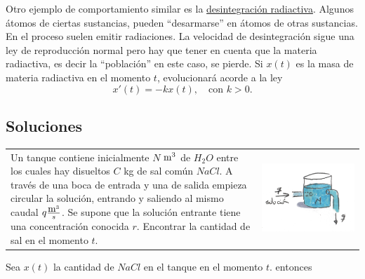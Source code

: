 \documentclass{article}
\newcounter{ejemplo_cont}
\begin{document}
  Otro ejemplo de comportamiento similar es la \href{http://es.wikipedia.org/wiki/Radiactividad}{desintegración radiactiva}. Algunos átomos de
ciertas sustancias, pueden ``desarmarse'' en átomos de otras sustancias. En el proceso suelen emitir radiaciones.  La velocidad de desintegración sigue una ley
de reproducción normal pero hay que tener en cuenta que la materia radiactiva, es decir la ``población''  en este caso, se pierde. Si $x(t)$ es la masa de materia radiactiva en el momento $t$, evolucionará
acorde a la ley
\[\boxed{x'(t)=-kx(t),\quad\text{con } k>0.}\]



\subsection{Soluciones}

\begin{problema}
\begin{tabular}{m{5cm} m{4.5cm}}
 Un tanque contiene inicialmente $N$ $\hbox{m}^3$ de $H_2O$ entre los cuales hay disueltos $C$ kg de sal común
 $NaCl$. A través de una boca de entrada y una de salida empieza circular la solución, entrando y saliendo al mismo caudal $q\frac{\hbox{m}^3}{s}$. Se supone que 
 la solución entrante tiene una concentración conocida $r$. Encontrar la cantidad de sal en el momento $t$. &
  \includegraphics[scale=.1]{imagenes/tanque.jpg} \\
\end{tabular}
\end{problema}


 Sea $x(t)$ la cantidad de $NaCl$ en el tanque en el momento $t$. entonces
\end{document}
